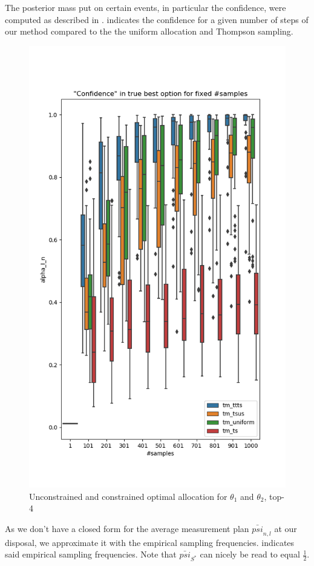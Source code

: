 The posterior mass put on certain events, in particular the confidence, were computed as described in .  indicates the confidence for a given number of steps of our method compared to the the uniform allocation and Thompson sampling.

\begin{figure}[h]
  \centering
  \includegraphics[width=.5\textwidth]{190723-confidences.png}
  \caption{Unconstrained and constrained optimal allocation for $\theta_1$ and $\theta_2$, top-4}
  \label{fig:confidences}
\end{figure}

As we don't have a closed form for the average measurement plan $\bar{psi}_{n,l}$ at our disposal, we approximate it with the empirical sampling frequencies.  indicates said empirical sampling frequencies. Note that $\bar{psi}_{S^*}$ can nicely be read to equal $\frac{1}{2}$.

